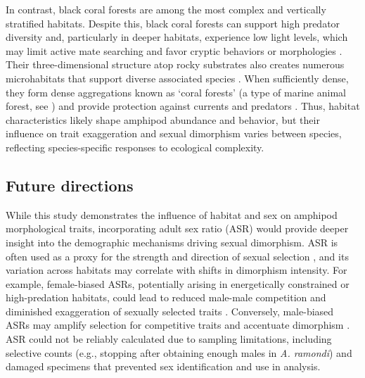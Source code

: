 \documentclass[journal,article,submit,pdftex,moreauthors]{Definitions/mdpi}
\begin{document}
    		In contrast, black coral forests are among the most complex and vertically stratified habitats. Despite this, black coral forests can support high predator diversity and, particularly in deeper habitats, experience low light levels, which may limit active mate searching and favor cryptic behaviors or morphologies \citep{navarro2024hidden}. Their three-dimensional structure atop rocky substrates also creates numerous microhabitats that support diverse associated species \citep{Czechowska2020}. When sufficiently dense, they form dense aggregations known as ‘coral forests’ (a type of marine animal forest, see \citep{Rossi2017}) and provide protection against currents and predators \citep{buhl2018cold}. Thus, habitat characteristics likely shape amphipod abundance and behavior, but their influence on trait exaggeration and sexual dimorphism varies between species, reflecting species-specific responses to ecological complexity.    		
    		
    		\subsection{Future directions}
    		
    		While this study demonstrates the influence of habitat and sex on amphipod morphological traits, incorporating adult sex ratio (ASR) would provide deeper insight into the demographic mechanisms driving sexual dimorphism. ASR is often used as a proxy for the strength and direction of sexual selection \citep{janicke2018operational}, and its variation across habitats may correlate with shifts in dimorphism intensity. For example, female-biased ASRs, potentially arising in energetically constrained or high-predation habitats, could lead to reduced male-male competition and diminished exaggeration of sexually selected traits \citep{Kokko2008}. Conversely, male-biased ASRs may amplify selection for competitive traits and accentuate dimorphism \citep{Kokko2008}. ASR could not be reliably calculated due to sampling limitations, including selective counts (e.g., stopping after obtaining enough males in \textit{A. ramondi}) and damaged specimens that prevented sex identification and use in analysis. 
    		
\end{document}
